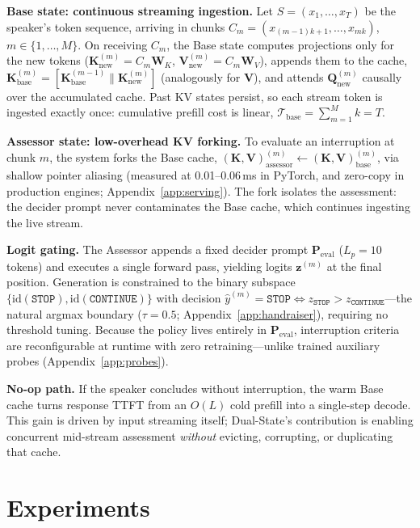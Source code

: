 \documentclass{article}
\begin{document}
\textbf{Base state: continuous streaming ingestion.} Let $S = (x_1, \dots, x_T)$ be the speaker's token sequence, arriving in chunks $C_m = (x_{(m-1)k+1}, \dots, x_{mk})$, $m \in \{1, \dots, M\}$. On receiving $C_m$, the Base state computes projections only for the new tokens ($\mathbf{K}_{\text{new}}^{(m)} = C_m \mathbf{W}_K$, $\mathbf{V}_{\text{new}}^{(m)} = C_m \mathbf{W}_V$), appends them to the cache, $\mathbf{K}_{\text{base}}^{(m)} = [ \mathbf{K}_{\text{base}}^{(m-1)} \| \mathbf{K}_{\text{new}}^{(m)} ]$ (analogously for $\mathbf{V}$), and attends $\mathbf{Q}_{\text{new}}^{(m)}$ causally over the accumulated cache. Past KV states persist, so each stream token is ingested exactly once: cumulative prefill cost is linear, $\mathcal{T}_{\text{base}} = \sum_{m=1}^{M} k = T$.

\textbf{Assessor state: low-overhead KV forking.} To evaluate an interruption at chunk $m$, the system forks the Base cache, $(\mathbf{K}, \mathbf{V})_{\text{assessor}}^{(m)} \leftarrow (\mathbf{K}, \mathbf{V})_{\text{base}}^{(m)}$, via shallow pointer aliasing (measured at 0.01--0.06\,ms in PyTorch, and zero-copy in production engines; Appendix~\ref{app:serving}). The fork isolates the assessment: the decider prompt never contaminates the Base cache, which continues ingesting the live stream.

\textbf{Logit gating.} The Assessor appends a fixed decider prompt $\mathbf{P}_{\text{eval}}$ ($L_p = 10$ tokens) and executes a single forward pass, yielding logits $\mathbf{z}^{(m)}$ at the final position. Generation is constrained to the binary subspace $\{\text{id}(\texttt{STOP}), \text{id}(\texttt{CONTINUE})\}$ with decision $\hat{y}^{(m)} = \texttt{STOP} \iff z_{\texttt{STOP}} > z_{\texttt{CONTINUE}}$---the natural argmax boundary ($\tau = 0.5$; Appendix~\ref{app:handraiser}), requiring no threshold tuning. Because the policy lives entirely in $\mathbf{P}_{\text{eval}}$, interruption criteria are reconfigurable at runtime with zero retraining---unlike trained auxiliary probes (Appendix~\ref{app:probes}).

\textbf{No-op path.} If the speaker concludes without interruption, the warm Base cache turns response TTFT from an $O(L)$ cold prefill into a single-step decode. This gain is driven by input streaming itself; Dual-State's contribution is enabling concurrent mid-stream assessment \emph{without} evicting, corrupting, or duplicating that cache.

\section{Experiments}
\label{sec:exp}
\end{document}

